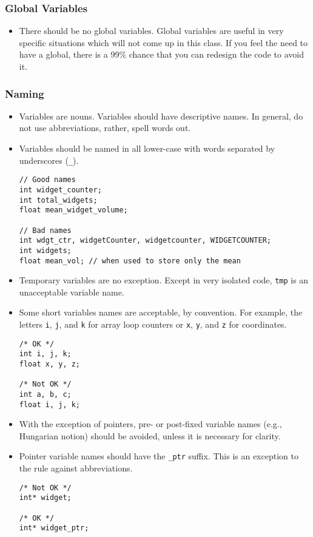 \subsubsection{Global Variables}

\begin{itemize}
    \item There should be no global variables.  Global variables are useful in very specific situations which will not come up in this class.  If you feel the need to have a global, there is a 99\% chance that you can redesign the code to avoid it.
\end{itemize}

\subsubsection{Naming}

\begin{itemize}
    \item Variables are nouns.  Variables should have descriptive names.  In general, do not use abbreviations, rather, spell words out.
    \item Variables should be named in all lower-case with words separated by underscores (\texttt{\_}).
        \begin{verbatim}
// Good names
int widget_counter;
int total_widgets;
float mean_widget_volume;

// Bad names
int wdgt_ctr, widgetCounter, widgetcounter, WIDGETCOUNTER;
int widgets; 
float mean_vol; // when used to store only the mean
\end{verbatim}

    \item Temporary variables are no exception.  Except in very isolated code, \texttt{tmp} is an unacceptable variable name.
    \item Some short variables names are acceptable, by convention.  For example, the letters \texttt{i}, \texttt{j}, and \texttt{k} for array loop counters or \texttt{x}, \texttt{y}, and \texttt{z} for coordinates.

        \begin{verbatim}
/* OK */
int i, j, k;
float x, y, z;

/* Not OK */
int a, b, c; 
float i, j, k;
        \end{verbatim}
    \item With the exception of pointers, pre- or post-fixed variable names (e.g., Hungarian notion) should be avoided, unless it is necessary for clarity.
    \item Pointer variable names should have the \texttt{\_ptr} suffix.  This is an exception to the rule against abbreviations.
        \begin{verbatim}
/* Not OK */
int* widget;

/* OK */
int* widget_ptr;
        \end{verbatim}

\end{itemize}

